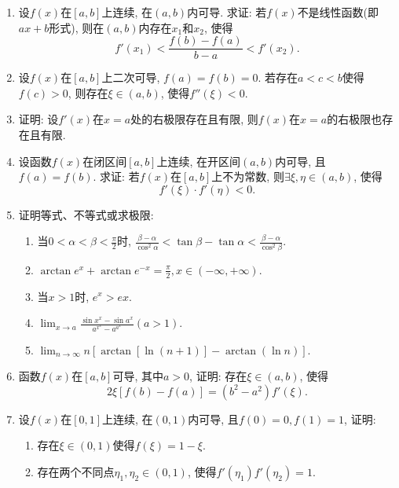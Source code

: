 \documentclass[UTF8,11pt, a4paper, oneside, fontset=none]{ctexbook}
\begin{document}
\begin{enumerate}

\item 设$f(x)$在$[a, b]$上连续, 在$(a, b)$内可导. 求证: 若$f(x)$不是线性函数(即$ax+b$形式), 则在$(a, b)$内存在$x_1$和$x_2$, 使得
\[
f'(x_1) < \frac{f(b) - f(a)}{b-a} < f'(x_2).
\]

\item 设$f(x)$在$[a, b]$上二次可导, $f(a) = f(b) =0$. 若存在$a < c < b$使得$f(c) >0$, 则存在$\xi \in (a, b)$, 使得$f''(\xi) <0$.

\item 证明: 设$f'(x)$在$x=a$处的右极限存在且有限, 则$f(x)$在$x=a$的右极限也存在且有限.

\item 设函数$f(x)$在闭区间$[a, b]$上连续, 在开区间$(a, b)$内可导, 且$f(a) = f(b)$. 求证: 若$f(x)$在$[a, b]$上不为常数, 则$\exists \xi, \eta \in (a, b)$, 使得
\[
f'(\xi) \cdot f'(\eta) <0.
\]

\item 证明等式、不等式或求极限:
\begin{enumerate}
\item 当$0 < \alpha < \beta < \frac{\pi}{2}$时, $\frac{\beta - \alpha}{\cos^2 \alpha} < \tan \beta - \tan \alpha < \frac{\beta - \alpha}{\cos^2 \beta}$.

\item $\arctan e^x + \arctan e^{-x} = \frac{\pi}{2}, x \in (-\infty, +\infty)$.

\item 当$x>1$时, $e^x > e x$.

\item $\lim_{x \to a} \frac{\sin x^x - \sin a^x}{a^{x^x} - a^{a^x}} (a > 1)$.

\item $\lim_{n \to \infty} n[\arctan[\ln(n+1)] - \arctan (\ln n)]$.

\end{enumerate}

\item 函数$f(x)$在$[a, b]$可导, 其中$a >0$, 证明: 存在$\xi \in (a, b)$, 使得
\[
2 \xi [f(b) - f(a)] = (b^2 - a^2) f'(\xi).
\]

\item 设$f(x)$在$[0, 1]$上连续, 在$(0, 1)$内可导, 且$f(0) =0, f(1) = 1$, 证明:
\begin{enumerate}
\item 存在$\xi \in (0, 1)$使得$f(\xi) = 1 - \xi$.
\item 存在两个不同点$\eta_1, \eta_2 \in (0, 1)$, 使得$f'(\eta_1) f'(\eta_2) = 1$.
\end{enumerate}

\end{enumerate}
\end{document}

